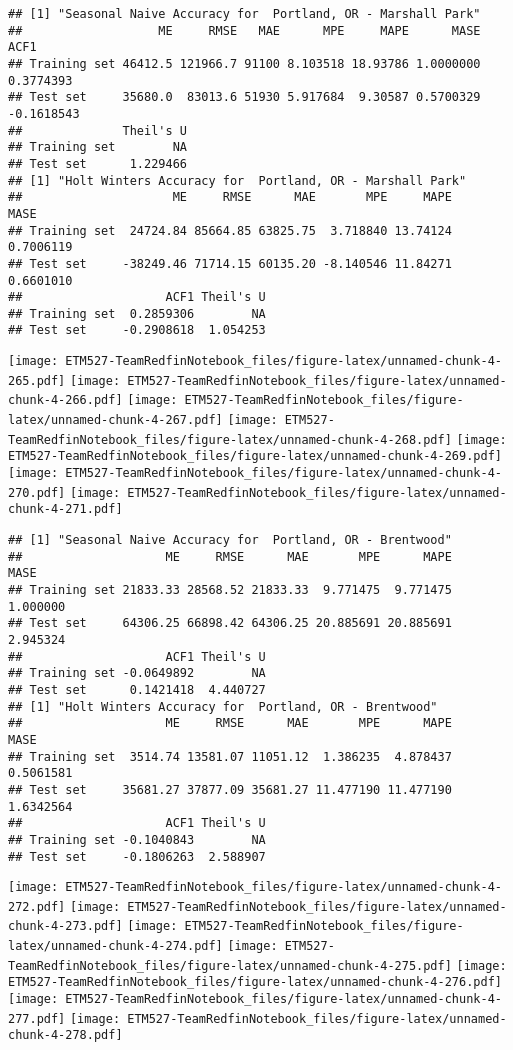 \documentclass[]{article}
\begin{document}
\begin{verbatim}
## [1] "Seasonal Naive Accuracy for  Portland, OR - Marshall Park"
##                   ME     RMSE   MAE      MPE     MAPE      MASE       ACF1
## Training set 46412.5 121966.7 91100 8.103518 18.93786 1.0000000  0.3774393
## Test set     35680.0  83013.6 51930 5.917684  9.30587 0.5700329 -0.1618543
##              Theil's U
## Training set        NA
## Test set      1.229466
## [1] "Holt Winters Accuracy for  Portland, OR - Marshall Park"
##                     ME     RMSE      MAE       MPE     MAPE      MASE
## Training set  24724.84 85664.85 63825.75  3.718840 13.74124 0.7006119
## Test set     -38249.46 71714.15 60135.20 -8.140546 11.84271 0.6601010
##                    ACF1 Theil's U
## Training set  0.2859306        NA
## Test set     -0.2908618  1.054253
\end{verbatim}

\texttt{[image: ETM527-TeamRedfinNotebook\_files/figure-latex/unnamed-chunk-4-265.pdf]}
\texttt{[image: ETM527-TeamRedfinNotebook\_files/figure-latex/unnamed-chunk-4-266.pdf]}
\texttt{[image: ETM527-TeamRedfinNotebook\_files/figure-latex/unnamed-chunk-4-267.pdf]}
\texttt{[image: ETM527-TeamRedfinNotebook\_files/figure-latex/unnamed-chunk-4-268.pdf]}
\texttt{[image: ETM527-TeamRedfinNotebook\_files/figure-latex/unnamed-chunk-4-269.pdf]}
\texttt{[image: ETM527-TeamRedfinNotebook\_files/figure-latex/unnamed-chunk-4-270.pdf]}
\texttt{[image: ETM527-TeamRedfinNotebook\_files/figure-latex/unnamed-chunk-4-271.pdf]}

\begin{verbatim}
## [1] "Seasonal Naive Accuracy for  Portland, OR - Brentwood"
##                    ME     RMSE      MAE       MPE      MAPE     MASE
## Training set 21833.33 28568.52 21833.33  9.771475  9.771475 1.000000
## Test set     64306.25 66898.42 64306.25 20.885691 20.885691 2.945324
##                    ACF1 Theil's U
## Training set -0.0649892        NA
## Test set      0.1421418  4.440727
## [1] "Holt Winters Accuracy for  Portland, OR - Brentwood"
##                    ME     RMSE      MAE       MPE      MAPE      MASE
## Training set  3514.74 13581.07 11051.12  1.386235  4.878437 0.5061581
## Test set     35681.27 37877.09 35681.27 11.477190 11.477190 1.6342564
##                    ACF1 Theil's U
## Training set -0.1040843        NA
## Test set     -0.1806263  2.588907
\end{verbatim}

\texttt{[image: ETM527-TeamRedfinNotebook\_files/figure-latex/unnamed-chunk-4-272.pdf]}
\texttt{[image: ETM527-TeamRedfinNotebook\_files/figure-latex/unnamed-chunk-4-273.pdf]}
\texttt{[image: ETM527-TeamRedfinNotebook\_files/figure-latex/unnamed-chunk-4-274.pdf]}
\texttt{[image: ETM527-TeamRedfinNotebook\_files/figure-latex/unnamed-chunk-4-275.pdf]}
\texttt{[image: ETM527-TeamRedfinNotebook\_files/figure-latex/unnamed-chunk-4-276.pdf]}
\texttt{[image: ETM527-TeamRedfinNotebook\_files/figure-latex/unnamed-chunk-4-277.pdf]}
\texttt{[image: ETM527-TeamRedfinNotebook\_files/figure-latex/unnamed-chunk-4-278.pdf]}
\end{document}
